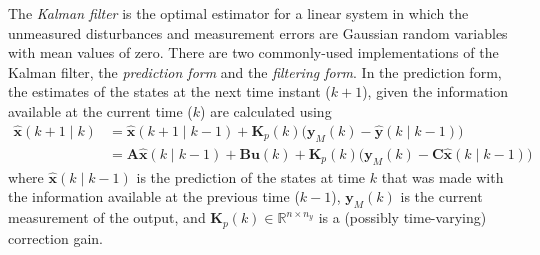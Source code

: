 The \textit{Kalman filter} \citep{kalman_new_1960} is the optimal estimator for a linear system in which the unmeasured disturbances and measurement errors are Gaussian random variables with mean values of zero. There are two commonly-used implementations of the Kalman filter, the \textit{prediction form} and the \textit{filtering form}. In the prediction form, the estimates of the states at the next time instant ($k+1$), given the information available at the current time ($k$) are calculated using
\begin{equation}
\begin{aligned} \label{eq:xkp1_hat_p}
	\mathbf{\hat{x}}(k+1 \mid k) &= \mathbf{\hat{x}}(k+1 \mid k-1) + \mathbf{K}_p(k) \big( \mathbf{y}_M(k) - \mathbf{\hat{y}}(k \mid k-1) \big) \\
	&= \mathbf{A}\mathbf{\hat{x}}(k \mid k-1) + \mathbf{B}\mathbf{u}(k) + \mathbf{K}_p(k) \big( \mathbf{y}_M(k) - \mathbf{C} \mathbf{\hat{x}}(k \mid k-1) \big)
\end{aligned}
\end{equation}
%
where $\hat{\mathbf{x}}(k \mid k-1)$ is the prediction of the states at time $k$ that was made with the information available at the previous time ($k-1$), $\mathbf{y}_M(k)$ is the current measurement of the output, and $\mathbf{K}_p(k) \in \mathbb{R}^{n \times n_y}$ is a (possibly time-varying) correction gain.
%

